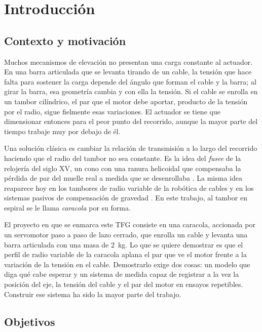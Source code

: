 \chapter{Introducción}
\label{chap:intro}

\section{Contexto y motivación}

Muchos mecanismos de elevación no presentan una carga constante al actuador. En una barra
articulada que se levanta tirando de un cable, la tensión que hace falta para sostener la carga
depende del ángulo que forman el cable y la barra; al girar la barra, esa geometría cambia y con
ella la tensión. Si el cable se enrolla en un tambor cilíndrico, el par que el motor debe
aportar, producto de la tensión por el radio, sigue fielmente esas variaciones. El actuador se
tiene que dimensionar entonces para el peor punto del recorrido, aunque la mayor parte del tiempo
trabaje muy por debajo de él.

Una solución clásica es cambiar la relación de transmisión a lo largo del recorrido haciendo que
el radio del tambor no sea constante. Es la idea del \emph{fusee} de la relojería del siglo XV,
un cono con una ranura helicoidal que compensaba la pérdida de par del muelle real a medida que se
desenrollaba \cite{landes1983}. La misma idea reaparece hoy en los tambores de radio variable de
la robótica de cables \cite{seriani2016,bieber2023} y en los sistemas pasivos de compensación de
gravedad \cite{shen2022,endo2010}. En este trabajo, al tambor en espiral se le llama
\emph{caracola} por su forma.

El proyecto en que se enmarca este TFG consiste en una caracola, accionada por un servomotor paso
a paso de lazo cerrado, que enrolla un cable y levanta una barra articulada con una masa de
\SI{2}{\kilo\gram}. Lo que se quiere demostrar es que el perfil de radio variable de la caracola
aplana el par que ve el motor frente a la variación de la tensión en el cable. Demostrarlo exige
dos cosas: un modelo que diga qué cabe esperar y un sistema de medida capaz de registrar a la vez
la posición del eje, la tensión del cable y el par del motor en ensayos repetibles. Construir ese
sistema ha sido la mayor parte del trabajo.

\section{Objetivos}

